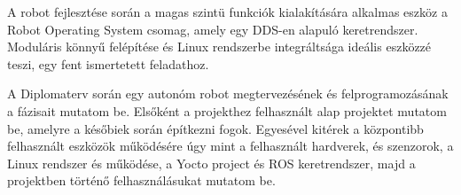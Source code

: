 A robot fejlesztése során a magas szintü funkciók kialakítására alkalmas eszköz a
Robot Operating System csomag, amely egy DDS-en alapuló keretrendszer. Moduláris
könnyű felépítése és Linux rendszerbe integráltsága ideális eszközzé teszi, egy
fent ismertetett feladathoz.

A Diplomaterv során egy autonóm robot megtervezésének és felprogramozásának a
fázisait mutatom be. Elsőként a projekthez felhasznált alap projektet mutatom be,
amelyre a későbiek során építkezni fogok. Egyesével kitérek a központibb
felhasznált eszközök működésére úgy mint a felhasznált hardverek, és szenzorok, a
Linux rendszer és működése, a Yocto project és ROS keretrendszer, majd a
projektben történő felhasználásukat mutatom be.



